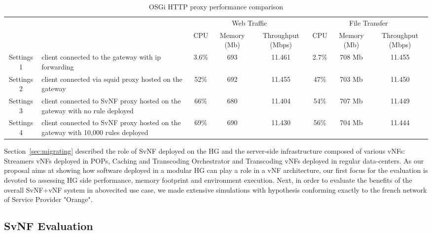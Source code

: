 \begin{table}
	\centering
	\begin{tabular}{| c | p{}|c |c |c || c |c |c |}
	
	
 	    \multicolumn{2}{c}{} & \multicolumn{3}{c}{Web Traffic} 		  & \multicolumn{3}{c}{File Transfer} \\
 	     \cline{3-8}	
             \multicolumn{2}{c|}{} & CPU 			& Memory (Mb) 		& Throughput (Mbps)	& CPU 		& Memory (Mb)		& Throughput (Mbps) \\\hline   
Settings 1 & client connected to the gateway with ip forwarding &   3.6\% 		& 693 		& 11.461		& 2.7\%		& 708 Mb		& 11.455 \\\hline
Settings 2 & client connected via squid proxy hosted on the gateway   &   52\%        & 692 		& 11.455		& 47\%		& 703 Mb		& 11.450 \\\hline
Settings 3 & client connected to SvNF proxy hosted on the gateway with no rule deployed &   66\%		& 680 		& 11.404		& 54\%		& 707 Mb		& 11.449 \\\hline
Settings 4 & client connected to SvNF proxy hosted on the gateway with 10,000 rules deployed   &   69\%        & 690 		& 11.430		& 56\%		& 704 Mb		& 11.444 \\\hline
	
	            
	\end{tabular}
	\caption{
	OSGi HTTP proxy performance comparison
	\label{tab:perf-comparison}
	}
	
\end{table}

Section~\ref{sec:migrating} described the role of SvNF deployed on the HG and the server-side infrastructure composed of various vNFs: Streamers vNFs deployed in POPs, Caching and Transcoding Orchestrator and Transcoding vNFs deployed in regular data-centers.
As our proposal aims at showing how software deployed in a modular HG can play a role in a vNF architecture, our first focus for the evaluation is devoted to assessing HG side performance, memory footprint and environment execution.
Next, in order to evaluate the benefits of the overall SvNF+vNF system in abovecited use case, we made extensive simulations with hypothesis conforming exactly to the french network of Service Provider "Orange".

\subsection{SvNF Evaluation }\label{Testbed}

